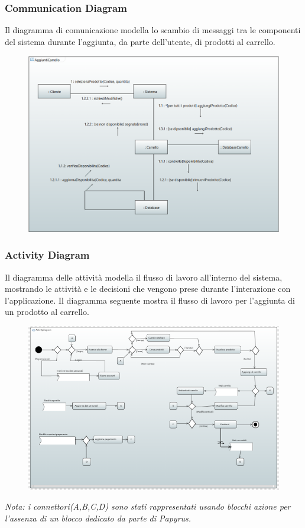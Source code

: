 \documentclass[a4paper,12pt]{article}
\begin{document}
\subsubsection{Communication Diagram}
Il diagramma di comunicazione modella lo scambio di messaggi tra le componenti del sistema durante l'aggiunta, da parte dell'utente, di prodotti al carrello.
\begin{figure}[H]
    \centering
    \includegraphics[width=1\textwidth]{../UML/UML png/CommunicationDiagram.png}
    \label{fig:Communication Diagram}
\end{figure}
\subsubsection{Activity Diagram}
Il diagramma delle attività modella il flusso di lavoro all'interno del sistema, mostrando le attività e le decisioni che vengono prese durante l'interazione con l'applicazione.   
Il diagramma seguente mostra il flusso di lavoro per l'aggiunta di un prodotto al carrello.
\begin{figure}[H]
    \centering
    \includegraphics[width=1\textwidth]{../UML/UML png/ActivityDiagram.png}
    \label{fig:Activity Diagram}
\end{figure}
\textit{Nota: i connettori(A,B,C,D) sono stati rappresentati usando blocchi azione per l'assenza di un blocco dedicato da parte di Papyrus.}
\end{document}
